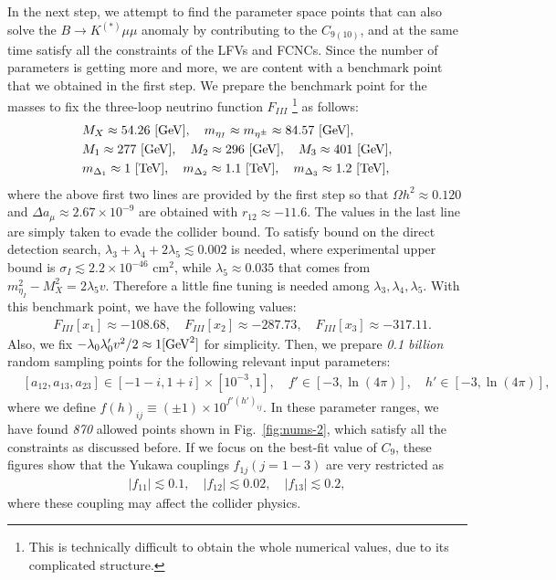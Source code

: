 \documentclass[%
showkeys,12pt,
preprint,preprintnumbers,nofootinbib,
groupedaddress,superscriptaddress,amsmath,amssymb]{revtex4}
\numberwithin{equation}{section}
\begin{document}
In the next step, we attempt to find the parameter space points that can
also solve the $B\to K^{(*)}\mu\mu$ anomaly by contributing to the $C_{9(10)}$,
and at the same time satisfy all the constraints of the LFVs and FCNCs.
Since the number of parameters is getting more and more, we are content
with a benchmark point that we obtained in the first step.
We prepare the benchmark point for the masses to fix the 
three-loop neutrino function $F_{III}$
\footnote{This is technically difficult to obtain the whole numerical values,
 due to its complicated structure.} as follows:
\begin{align}
&M_X\approx 54.26\ [{\rm GeV}],\quad m_{\eta_I}\approx m_{\eta^\pm}\approx 84.57\ [{\rm GeV}],\\ 
& M_1\approx 277\ [{\rm GeV}],\quad M_2\approx 296\ [{\rm GeV}],\quad M_3\approx 401\ [{\rm GeV}],\\
&m_{\Delta_1}\approx1\ [{\rm TeV}],\quad m_{\Delta_2}\approx1.1\ [{\rm TeV}] ,\quad  m_{\Delta_3}\approx1.2\ [{\rm TeV}], 
\end{align}
where the above first two lines are provided by the first step 
so that $\Omega h^2\approx 0.120$ and $\Delta a_\mu\approx 2.67\times 10^{-9}$
are obtained with $r_{12}\approx -11.6$. The values in the last line 
are simply taken to evade the collider bound.
{
To satisfy bound on the direct detection search, $\lambda_3+\lambda_4+2\lambda_5\lesssim0.002$ is needed, where experimental upper bound is $\sigma_I\lesssim 2.2\times10^{-46}$ cm$^2$, while $\lambda_5\approx 0.035$ that comes from $m_{\eta_I}^2-M_X^2=2\lambda_5 v$. Therefore a little fine tuning is needed among $\lambda_3,\lambda_4,\lambda_5$.
}
With this benchmark point, we have the following values:
\begin{align}
& F_{III}[x_{1}]\approx-108.68,\quad
F_{III}[ x_{2}]\approx-287.73,\quad
 F_{III}[ x_{3}]\approx-317.11.
\end{align}
Also, we fix $-\lambda_0\lambda'_0 v^2/2\approx 1[{\rm GeV}^2]$ for simplicity. 
Then, we prepare {{\it 0.1 billion}} random sampling points
for the following relevant input parameters:
{\begin{align}
& [a_{12},a_{13},a_{23}] \in [-1-i, 1+i]\times [10^{-3},1],\quad
f'\in[-3,\ln(4\pi)],\quad h'\in[-3,\ln(4\pi)],
\end{align}
}
where we define $f(h)_{ij}\equiv (\pm1)\times10^{f'(h')_{ij}}$. 
In these parameter ranges, we have found {{\it 870}} allowed 
points shown in Fig.~\ref{fig:nums-2}, which satisfy all the constraints 
as discussed before. If we focus on the best-fit value of $C_9$, 
these figures show that the Yukawa couplings $f_{1j}(j=1-3)$ are 
very restricted as 
\begin{align}
|f_{11}| \lesssim {0.1},\quad  |f_{12}| \lesssim {0.02},\quad  |f_{13}| \lesssim {0.2},
\end{align}
where these coupling may affect the collider physics.
\end{document}
